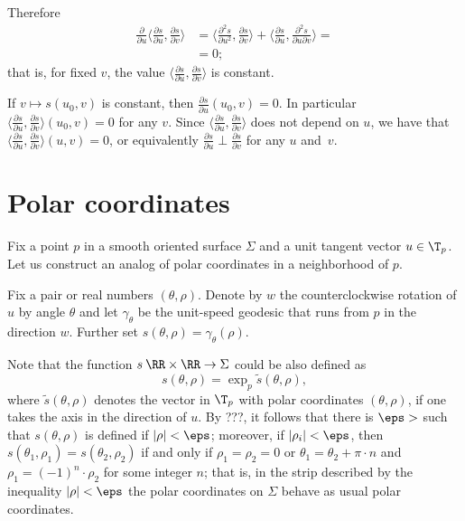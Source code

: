 Therefore
\begin{align*}
\tfrac{\partial}{\partial u}\langle\tfrac{\partial s}{\partial u},\tfrac{\partial s}{\partial v}\rangle
&=\langle\tfrac{\partial^2 s}{\partial u^2},\tfrac{\partial s}{\partial v}\rangle
+
\langle\tfrac{\partial s}{\partial u},\tfrac{\partial^2 s}{\partial u\partial v}\rangle=
\\
&=0;
\end{align*}
that is, for fixed $v$, the value $\langle\tfrac{\partial s}{\partial u},\tfrac{\partial s}{\partial v}\rangle$ is constant.

If $v\mapsto s(u_0,v)$ is constant, then $\tfrac{\partial s}{\partial u}(u_0,v)=0$.
In particular $\langle\tfrac{\partial s}{\partial u},\tfrac{\partial s}{\partial v}\rangle(u_0,v)=0$ for any $v$.
Since $\langle\tfrac{\partial s}{\partial u},\tfrac{\partial s}{\partial v}\rangle$ does not depend on $u$, we have that $\langle\tfrac{\partial s}{\partial u},\tfrac{\partial s}{\partial v}\rangle(u,v)=0$, or equivalently
$\tfrac{\partial s}{\partial u}\perp \tfrac{\partial s}{\partial v}$ for any $u$ and~$v$.
\qeds

\section*{Polar coordinates}

Fix a point $p$ in a smooth oriented surface $\Sigma$ and a unit tangent vector $u\in\T_p$.
Let us construct an analog of polar coordinates in a neighborhood of $p$.

Fix a pair or real numbers $(\theta,\rho)$.
Denote by $w$ the counterclockwise rotation of $u$ by angle $\theta$ and let $\gamma_\theta$ be the unit-speed geodesic that runs from $p$ in the direction $w$.
Further set $s(\theta,\rho)=\gamma_\theta(\rho)$.

Note that the function $s\:\RR\times \RR\to \Sigma$ could be also defined as 
\[s(\theta,\rho)=\exp_p\tilde s(\theta,\rho),\]
where $\tilde s(\theta,\rho)$ denotes the vector in $\T_p$ with polar coordinates $(\theta,\rho)$, if one takes the axis in the direction of $u$.
By ???, it follows that there is $\eps>$ such that $s(\theta,\rho)$ is defined if $|\rho|<\eps$;
moreover, if $|\rho_i|<\eps$, then $s(\theta_1,\rho_1)=s(\theta_2,\rho_2)$ if and only if $\rho_1=\rho_2=0$ or $\theta_1=\theta_2+\pi\cdot n$ and $\rho_1=(-1)^n\cdot \rho_2$ for some integer $n$;
that is, in the strip described by the inequality $|\rho|<\eps$ the polar coordinates on $\Sigma$ behave as usual polar coordinates.

